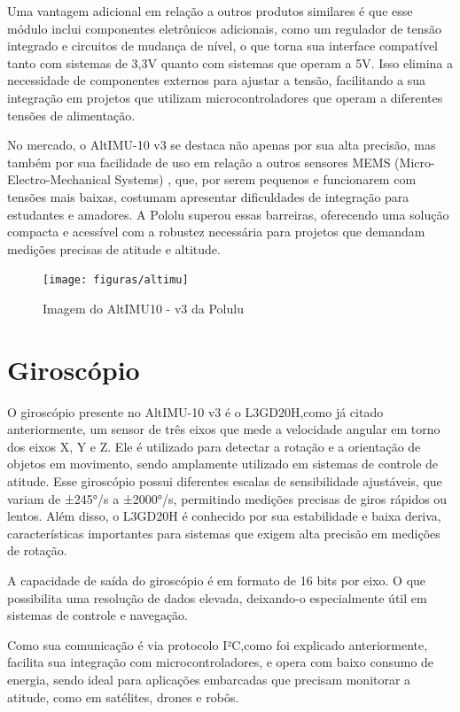 \documentclass[
	12pt,				%
	openright,			%
	oneside,			%
	a4paper,			%
	english,			%
	brazil				%
	]{abntex2}
\begin{document}
Uma vantagem adicional em relação a outros produtos similares é que esse módulo inclui componentes eletrônicos adicionais, como um regulador de tensão integrado e circuitos de mudança de nível, o que torna sua interface compatível tanto com sistemas de 3,3V quanto com sistemas que operam a 5V. Isso elimina a necessidade de componentes externos para ajustar a tensão, facilitando a sua integração em projetos que utilizam microcontroladores que operam a diferentes tensões de alimentação.

No mercado, o AltIMU-10 v3 se destaca não apenas por sua alta precisão, mas também por sua facilidade de uso em relação a outros sensores MEMS (Micro-Electro-Mechanical Systems) , que, por serem pequenos e funcionarem com tensões mais baixas, costumam apresentar dificuldades de integração para estudantes e amadores. A Pololu superou essas barreiras, oferecendo uma solução compacta e acessível com a robustez necessária para projetos que demandam medições precisas de atitude e altitude. \cite{Polulu2024}

\begin{figure}[h]
	\centering
	\texttt{[image: figuras/altimu]}
	\caption[AltIMU10 - v3]{Imagem do AltIMU10 - v3 da Polulu}
	\label{fig:altimu}
\end{figure}


\section{Giroscópio}
O giroscópio presente no AltIMU-10 v3 é o L3GD20H,como já citado anteriormente, um sensor de três eixos que mede a velocidade angular em torno dos eixos X, Y e Z. Ele é utilizado para detectar a rotação e a orientação de objetos em movimento, sendo amplamente utilizado em sistemas de controle de atitude. Esse giroscópio possui diferentes escalas de sensibilidade ajustáveis, que variam de ±245°/s a ±2000°/s, permitindo medições precisas de giros rápidos ou lentos. Além disso, o L3GD20H é conhecido por sua estabilidade e baixa deriva, características importantes para sistemas que exigem alta precisão em medições de rotação. 

A capacidade de saída do giroscópio é em formato de 16 bits por eixo. O que possibilita uma resolução de dados elevada, deixando-o especialmente útil em sistemas de controle e navegação.

Como sua comunicação é via protocolo I²C,como foi explicado anteriormente, facilita sua integração com microcontroladores, e opera com baixo consumo de energia, sendo ideal para aplicações embarcadas que precisam monitorar a atitude, como em satélites, drones e robôs.
\end{document}
